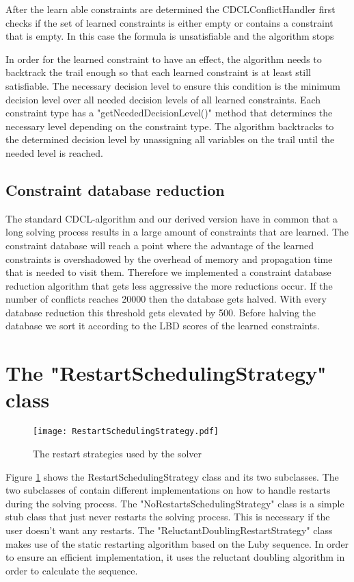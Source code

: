 After the learn able constraints are determined the CDCLConflictHandler first checks if the set of learned constraints is either empty or contains a constraint that is empty. In this case the formula is unsatisfiable and the algorithm stops
\par
In order for the learned constraint to have an effect, the algorithm needs to backtrack the trail enough so that each learned constraint is at least still satisfiable. The necessary decision level to ensure this condition is the minimum decision level over all needed decision levels of all learned constraints. Each constraint type has a "getNeededDecisionLevel()" method that determines the necessary level depending on the constraint type. The algorithm backtracks to the determined decision level by unassigning all variables on the trail until the needed level is reached.

\subsection{Constraint database reduction}

The standard CDCL-algorithm and our derived version have in common that a long solving process results in a large amount of constraints that are learned. The constraint database will reach a point where the advantage of the learned constraints is overshadowed by the overhead of memory and propagation time that is needed to visit them. Therefore we implemented a constraint database reduction algorithm that gets less aggressive the more reductions occur. If the number of conflicts reaches 20000 then the database gets halved. With every database reduction this threshold gets elevated by 500. Before halving the database we sort it according to the LBD scores of the learned constraints.

\section{The "RestartSchedulingStrategy" class}

\begin{figure}[htbp]
  \centering
  \texttt{[image: RestartSchedulingStrategy.pdf]}	
  \caption{The restart strategies used by the solver}
  \label{fig:restartScheduling}
\end{figure}


Figure \ref{fig:restartScheduling} shows the RestartSchedulingStrategy class and its two subclasses. The two subclasses of contain different implementations on how to handle restarts during the solving process. The "NoRestartsSchedulingStrategy" class is a simple stub class that just never restarts the solving process. This is necessary if the user doesn't want any restarts. The "ReluctantDoublingRestartStrategy" class makes use of the static restarting algorithm based on the Luby sequence. In order to ensure an efficient implementation, it uses the reluctant doubling algorithm in order to calculate the sequence.

